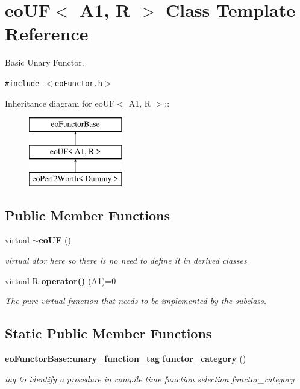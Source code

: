 \section{eo\-UF$<$ A1, R $>$ Class Template Reference}
\label{classeo_u_f}
Basic Unary Functor.  


{\tt \#include $<$eo\-Functor.h$>$}

Inheritance diagram for eo\-UF$<$ A1, R $>$::\begin{figure}[H]
\begin{center}
\leavevmode
\includegraphics[height=3cm]{classeo_u_f}
\end{center}
\end{figure}
\subsection*{Public Member Functions}
\begin{CompactItemize}
\item 
virtual {\bf $\sim$eo\-UF} ()\label{classeo_u_f_a0}

\begin{CompactList}\small\item\em virtual dtor here so there is no need to define it in derived classes \item\end{CompactList}\item 
virtual R {\bf operator()} (A1)=0\label{classeo_u_f_a1}

\begin{CompactList}\small\item\em The pure virtual function that needs to be implemented by the subclass. \item\end{CompactList}\end{CompactItemize}
\subsection*{Static Public Member Functions}
\begin{CompactItemize}
\item 
{\bf eo\-Functor\-Base::unary\_\-function\_\-tag} {\bf functor\_\-category} ()\label{classeo_u_f_e0}

\begin{CompactList}\small\item\em tag to identify a procedure in compile time function selection functor\_\-category \item\end{CompactList}\end{CompactItemize}



